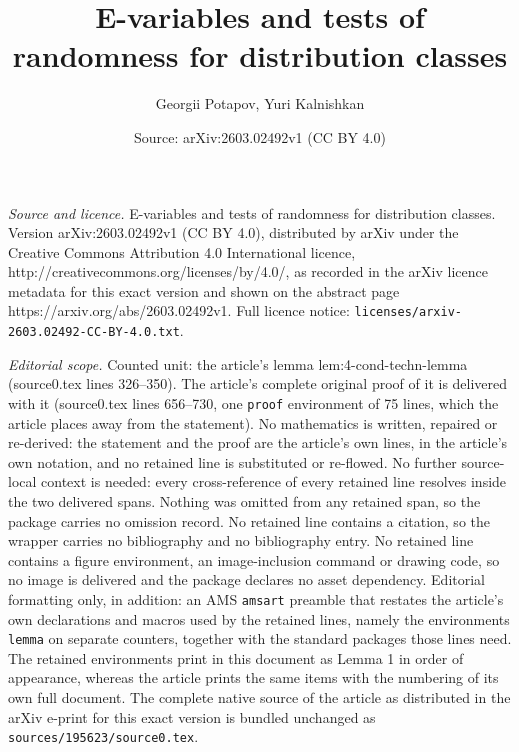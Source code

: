 \documentclass[10pt,a4paper]{amsart}
\title{E-variables and tests of randomness for distribution classes}
\author{Georgii Potapov, Yuri Kalnishkan}
\date{Source: arXiv:2603.02492v1 (CC BY 4.0)}
\begin{document}
\maketitle

\noindent\emph{Source and licence.} E-variables and tests of randomness for distribution classes. Version arXiv:2603.02492v1 (CC BY 4.0), distributed by arXiv under the Creative Commons Attribution 4.0 International licence, http://creativecommons.org/licenses/by/4.0/, as recorded in the arXiv licence metadata for this exact version and shown on the abstract page https://arxiv.org/abs/2603.02492v1. Full licence notice: \texttt{licenses/arxiv-2603.02492-CC-BY-4.0.txt}.\par\smallskip

\noindent\textit{Editorial scope.} Counted unit: the article's lemma lem:4-cond-techn-lemma (source0.tex lines 326--350). The article's complete original proof of it is delivered with it (source0.tex lines 656--730, one \texttt{proof} environment of 75 lines, which the article places away from the statement). No mathematics is written, repaired or re-derived: the statement and the proof are the article's own lines, in the article's own notation, and no retained line is substituted or re-flowed.  No further source-local context is needed: every cross-reference of every retained line resolves inside the two delivered spans.  Nothing was omitted from any retained span, so the package carries no omission record.  No retained line contains a citation, so the wrapper carries no bibliography and no bibliography entry.  No retained line contains a figure environment, an image-inclusion command or drawing code, so no image is delivered and the package declares no asset dependency.  Editorial formatting only, in addition: an AMS \texttt{amsart} preamble that restates the article's own declarations and macros used by the retained lines, namely the environments \texttt{lemma} on separate counters, together with the standard packages those lines need.  The retained environments print in this document as Lemma 1 in order of appearance, whereas the article prints the same items with the numbering of its own full document.  The complete native source of the article as distributed in the arXiv e-print for this exact version is bundled unchanged as \texttt{sources/195623/source0.tex}.
\end{document}
